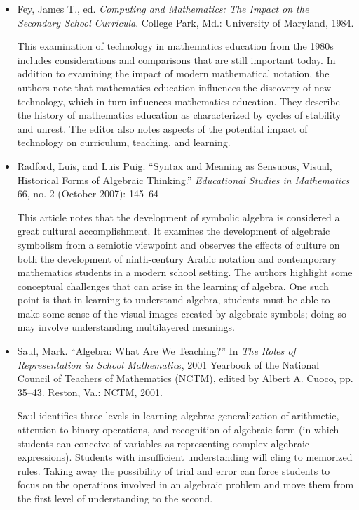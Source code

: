 \documentclass[
  10pt,
  a4paper,
  landscape,
  twoside,
  openany
]{scrbook}
\newcommand{\EN}[1]{#1}
\begin{document}
\TriPara
{
\EN{
  \begin{itemize}
    \item Fey, James T., ed. \emph{Computing and Mathematics: The Impact on the Secondary School Curricula}. College Park, Md.: University of Maryland, 1984.

      This examination of technology in mathematics education from the 1980s includes considerations and comparisons that are still important today. In addition to examining the impact of modern mathematical notation, the authors note that mathematics education influences the discovery of new technology, which in turn influences mathematics education. They describe the history of mathematics education as characterized by cycles of stability and unrest. The editor also notes aspects of the potential impact of technology on curriculum, teaching, and learning.

    \item Radford, Luis, and Luis Puig. ``Syntax and Meaning as Sensuous, Visual, Historical Forms of Algebraic Thinking.'' \emph{Educational Studies in Mathematics} 66, no. 2 (October 2007): 145--64

      This article notes that the development of symbolic algebra is considered a great cultural accomplishment. It examines the development of algebraic symbolism from a semiotic viewpoint and observes the effects of culture on both the development of ninth-century Arabic notation and contemporary mathematics students in a modern school setting. The authors highlight some conceptual challenges that can arise in the learning of algebra. One such point is that in learning to understand algebra, students must be able to make some sense of the visual images created by algebraic symbols; doing so may involve understanding multilayered meanings.

    \item Saul, Mark. ``Algebra: What Are We Teaching?'' In \emph{The Roles of Representation in School Mathematic}s, 2001 Yearbook of the National Council of Teachers of Mathematics (NCTM), edited by Albert A. Cuoco, pp. 35--43. Reston, Va.: NCTM, 2001.

      Saul identifies three levels in learning algebra: generalization of arithmetic, attention to binary operations, and recognition of algebraic form (in which students can conceive of variables as representing complex algebraic expressions). Students with insufficient understanding will cling to memorized rules. Taking away the possibility of trial and error can force students to focus on the operations involved in an algebraic problem and move them from the first level of understanding to the second.
    

\end{itemize}}}
\end{document}
